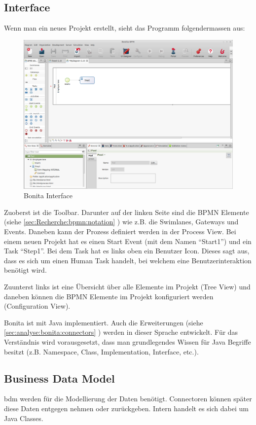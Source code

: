 \subsection{Interface}
Wenn man ein neues Projekt erstellt, sieht das Programm folgendermassen aus:
\begin{figure}[H]
	\centering
	\includegraphics[width=1\textwidth]{images/bonita.png}
	\caption{Bonita Interface}
	\label{fig:analyse:bonita:interface}
\end{figure}
Zuoberst ist die Toolbar. Darunter auf der linken Seite sind die BPMN Elemente (siehe \cref{sec:Recherche:bpmn:notation} ) wie z.B. die Swimlanes, Gateways und Events. Daneben kann der Prozess definiert werden in der Process View. Bei einem neuen Projekt hat es einen Start Event (mit dem Namen "`Start1"') und ein Task "`Step1"'. Bei dem Task hat es links oben ein Benutzer Icon. Dieses sagt aus, dass es sich um einen Human Task handelt, bei welchem eine Benutzerinteraktion benötigt wird.

Zuunterst links ist eine Übersicht über alle Elemente im Projekt (Tree View) und daneben können die BPMN Elemente im Projekt konfiguriert werden (Configuration View).

Bonita ist mit Java implementiert. Auch die Erweiterungen (siehe \cref{sec:analyse:bonita:connectors} ) werden in dieser Sprache entwickelt. Für das Verständnis wird vorausgesetzt, dass man grundlegendes Wissen für Java Begriffe besitzt (z.B. Namespace, Class, Implementation, Interface, etc.).

\subsection{Business Data Model}
\gls{bdm} werden für die Modellierung der Daten benötigt. Connectoren können später diese Daten entgegen nehmen oder zurückgeben. Intern handelt es sich dabei um Java Classes.

